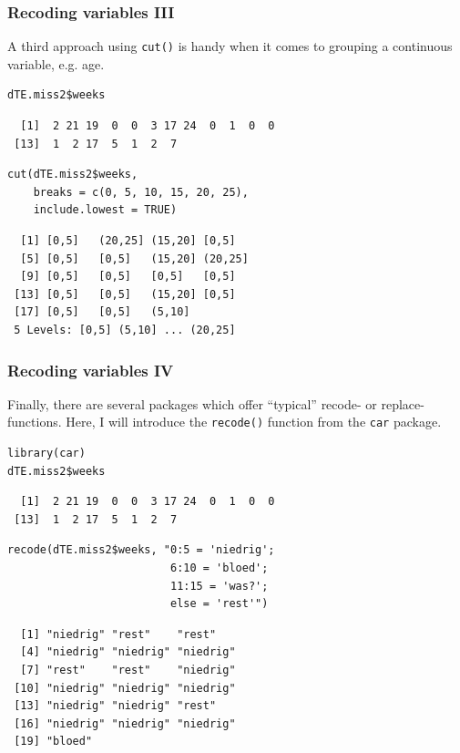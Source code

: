 \documentclass[bigger]{beamer}
\begin{document}
\begin{frame}[fragile]
\frametitle{Recoding variables III}
\label{sec-4-1-11}

    


    A third approach using \texttt{cut()} is handy when it comes to grouping a continuous variable,
    e.g. age. 


\lstset{language=R}
\begin{lstlisting}
dTE.miss2$weeks
\end{lstlisting}

\begin{verbatim}
  [1]  2 21 19  0  0  3 17 24  0  1  0  0
 [13]  1  2 17  5  1  2  7
\end{verbatim}


\lstset{language=R}
\begin{lstlisting}
cut(dTE.miss2$weeks, 
    breaks = c(0, 5, 10, 15, 20, 25), 
    include.lowest = TRUE)
\end{lstlisting}

\begin{verbatim}
  [1] [0,5]   (20,25] (15,20] [0,5]  
  [5] [0,5]   [0,5]   (15,20] (20,25]
  [9] [0,5]   [0,5]   [0,5]   [0,5]  
 [13] [0,5]   [0,5]   (15,20] [0,5]  
 [17] [0,5]   [0,5]   (5,10] 
 5 Levels: [0,5] (5,10] ... (20,25]
\end{verbatim}
\end{frame}
\begin{frame}[fragile,shrink = 5 ]
\frametitle{Recoding variables IV}
\label{sec-4-1-12}



    Finally, there are several packages which offer \enquote{typical} recode- or
    replace-functions. Here, I will introduce the \texttt{recode()} function from the
    \texttt{car} package. 


\lstset{language=R}
\begin{lstlisting}
library(car)
dTE.miss2$weeks
\end{lstlisting}

\begin{verbatim}
  [1]  2 21 19  0  0  3 17 24  0  1  0  0
 [13]  1  2 17  5  1  2  7
\end{verbatim}


\lstset{language=R}
\begin{lstlisting}
recode(dTE.miss2$weeks, "0:5 = 'niedrig'; 
                         6:10 = 'bloed'; 
                         11:15 = 'was?';
                         else = 'rest'")
\end{lstlisting}

\begin{verbatim}
  [1] "niedrig" "rest"    "rest"   
  [4] "niedrig" "niedrig" "niedrig"
  [7] "rest"    "rest"    "niedrig"
 [10] "niedrig" "niedrig" "niedrig"
 [13] "niedrig" "niedrig" "rest"   
 [16] "niedrig" "niedrig" "niedrig"
 [19] "bloed"
\end{verbatim}
\end{frame}
\end{document}
